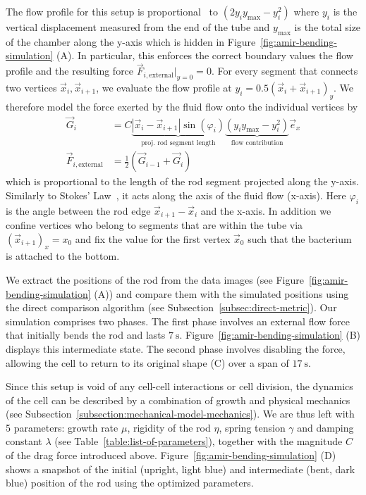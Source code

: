 The flow profile for this setup is proportional~\cite{Wolschin2021} to $(2y_iy_\text{max}-y_i^2)$
where $y_i$ is the vertical displacement measured from the end of the tube and $y_\text{max}$
is the total size of the chamber along the y-axis which is hidden in
Figure~\ref{fig:amir-bending-simulation} (A).
In particular, this enforces the correct boundary values the flow profile and the resulting force
$\vec{F}_{i,\text{external}}|_{y=0}=0$.
For every segment that connects two vertices $\vec{x}_i,\vec{x}_{i+1}$, we evaluate the flow profile
at $y_i=0.5(\vec{x}_i+\vec{x}_{i+1})_y$.
We therefore model the force exerted by the fluid flow onto the individual vertices by
\begin{align}
    \vec{G}_i &= C
    \underbrace{|\vec{x}_i - \vec{x}_{i+1}|\sin(\varphi_i)}_\text{proj. rod segment length}
    \underbrace{(y_iy_\text{max} - y_i^2)}_\text{flow contribution}\vec{e}_x\\
    \vec{F}_{i,\text{external}} &= \frac{1}{2}(\vec{G}_{i-1}+\vec{G}_i)
\end{align}
which is proportional to the length of the rod segment projected along the y-axis.
Similarly to Stokes' Law~\cite{Stokes1856}, it acts along the axis of the fluid flow (x-axis).
Here $\varphi_i$ is the angle between the rod edge $\vec{x}_{i+1}-\vec{x}_i$ and the x-axis.
In addition we confine vertices who belong to segments that are within the tube
via $(\vec{x}_{i+1})_x=x_0$ and fix the value for the first vertex
$\vec{x}_0$ such that the bacterium is attached to the bottom.

We extract the positions of the rod from the data images (see
Figure~\ref{fig:amir-bending-simulation} (A)) and compare them with the simulated positions using
the direct comparison algorithm (see Subsection~\ref{subsec:direct-metric}).
Our simulation comprises two phases.
The first phase involves an external flow force that initially bends the rod and lasts
$\SI{7}{\second}$.
Figure~\ref{fig:amir-bending-simulation} (B) displays this intermediate state.
The second phase involves disabling the force, allowing the cell to return to its original shape (C)
over a span of $\SI{17}{\second}$.

Since this setup is void of any cell-cell interactions or cell division, the dynamics of the cell
can be described by a combination of growth and physical mechanics (see
Subsection~\ref{subsection:mechanical-model-mechanics}).
We are thus left with 5 parameters: growth rate $\mu$, rigidity of the rod $\eta$, spring tension
$\gamma$ and damping constant $\lambda$ (see Table~\ref{table:list-of-parameters}), together with
the magnitude $C$ of the drag force introduced above.
Figure~\ref{fig:amir-bending-simulation} (D) shows a snapshot of the initial (upright, light blue)
and intermediate (bent, dark blue) position of the rod using the optimized parameters.

